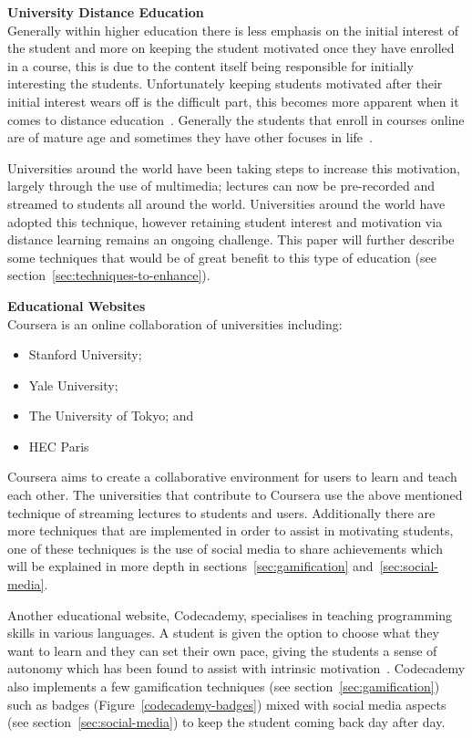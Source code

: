 \documentclass[a4paper,12pt]{article}
\begin{document}
\par
\textbf{University Distance Education}\\
Generally within higher education there is less emphasis on the initial interest of the student and more on keeping the student motivated once they have enrolled in a course, this is due to the content itself being responsible for initially interesting the students. Unfortunately keeping students motivated after their initial interest wears off is the difficult part, this becomes more apparent when it comes to distance education~\citep{distance-education}.
Generally the students that enroll in courses online are of mature age and sometimes they have other focuses in life~\citep{distance-education}.

\par
Universities around the world have been taking steps to increase this motivation, largely through the use of multimedia; lectures can now be pre-recorded and streamed to students all around the world. 
Universities around the world have adopted this technique, however retaining student interest and motivation via distance learning remains an ongoing challenge. 
This paper will further describe some techniques that would be of great benefit to this type of education (see section~\ref{sec:techniques-to-enhance}).

\par
\textbf{Educational Websites}\\ 
Coursera is an online collaboration of universities including: 
\begin{itemize}
	\item{Stanford University;}
	\item{Yale University;}
	\item{The University of Tokyo; and}
	\item{HEC Paris}
\end{itemize}
Coursera aims to create a collaborative environment for users to learn and teach each other. The universities that contribute to Coursera use the above mentioned technique of streaming lectures to students and users. Additionally there are more techniques that are implemented in order to assist in motivating students, one of these techniques is the use of social media to share achievements which will be explained in more depth in sections~\ref{sec:gamification} and~\ref{sec:social-media}.

\par
Another educational website, Codecademy, specialises in teaching programming skills in various languages. A student is given the option to choose what they want to learn and they can set their own pace, giving the students a sense of autonomy which has been found to assist with intrinsic motivation~\citep{bread-and-games}. 
Codecademy also implements a few gamification techniques (see section~\ref{sec:gamification}) such as badges (Figure~\ref{codecademy-badges}) mixed with social media aspects (see section~\ref{sec:social-media}) to keep the student coming back day after day.	
\end{document}

